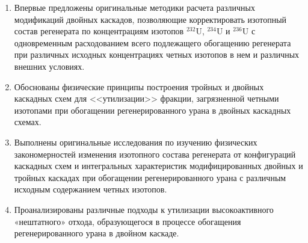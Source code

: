 {\novelty}
\begin{enumerate}
  \item Впервые предложены оригинальные методики расчета различных модификаций двойных каскадов, позволяющие корректировать
  изотопный состав регенерата по концентрациям изотопов $^{232}$U, $^{234}$U и $^{236}$U с одновременным расходованием всего подлежащего обогащению регенерата при различных исходных концентрациях четных изотопов в нем и различных внешних условиях.
  \item Обоснованы физические принципы построения тройных и двойных каскадных схем для <<утилизации>> фракции, загрязненной четными изотопами при обогащении регенерированного урана в двойных каскадных схемах.
  \item Выполнены оригинальные исследования по изучению физических закономерностей изменения изотопного состава регенерата
  от конфигураций каскадных схем и интегральных характеристик модифицированных двойных и тройных каскадах при обогащении регенерированного урана с различным исходным содержанием четных изотопов.
  \item Проанализированы различные подходы к утилизации высокоактивного «нештатного» отхода, образующегося в процессе обогащения регенерированного урана в двойном каскаде.

\end{enumerate}

